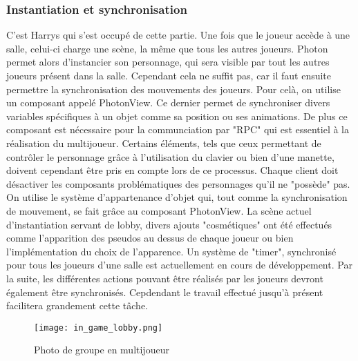     \subsubsection{Instantiation et synchronisation}
        C'est Harrys qui s'est occupé de cette partie. Une fois que le joueur accède à une salle,
        celui-ci charge une scène, la même que tous les autres joueurs.
        Photon permet alors d'instancier son personnage, qui sera visible par tout les autres joueurs
        présent dans la salle. Cependant cela ne suffit pas, car il faut ensuite permettre la synchronisation
        des mouvements des joueurs. Pour celà, on utilise un composant appelé PhotonView. Ce dernier permet de
        synchroniser divers variables spécifiques à un objet comme sa position ou ses animations. 
        De plus ce composant est nécessaire pour la communciation par "RPC" qui est essentiel à la réalisation du multijoueur.
        Certains éléments, tels que ceux permettant de contrôler le personnage grâce à l'utilisation du clavier ou bien d'une manette,
        doivent cependant être pris en compte lors de ce processus.
        Chaque client doit désactiver les composants problématiques des personnages qu'il ne "possède" pas.
        On utilise le système
        d'appartenance d'objet qui, tout comme la synchronisation de mouvement, se fait grâce au composant PhotonView.
        La scène actuel d'instantiation servant de lobby, divers ajouts "cosmétiques" ont été effectués comme l'apparition
        des pseudos au dessus de chaque joueur ou bien l'implémentation du choix de l'apparence.
        Un système de "timer", synchronisé pour tous les joueurs d'une salle est actuellement en cours de développement.
        Par la suite, les différentes actions pouvant être réalisés par les joueurs devront également être synchronisés.
        Cepdendant le travail effectué jusqu'à présent facilitera grandement cette tâche.
        
        \begin{figure}[!hbt]
                \centering \texttt{[image: in\_game\_lobby.png]} 
                \caption{Photo de groupe en multijoueur}
            \end{figure}